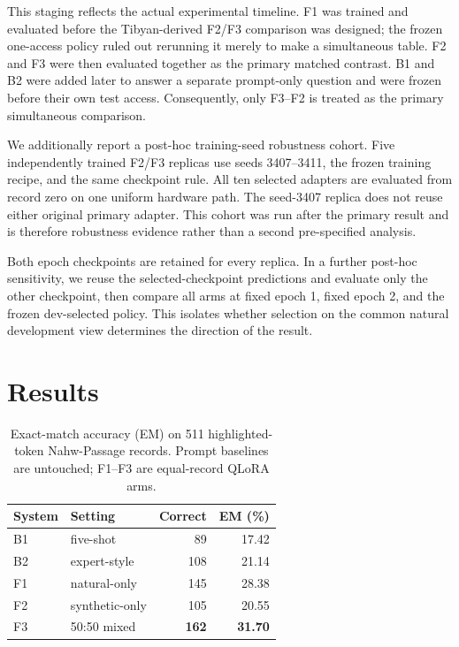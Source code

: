 \documentclass[11pt,a4paper]{article}
\begin{document}
This staging reflects the actual experimental timeline.  F1 was trained and
evaluated before the Tibyan-derived F2/F3 comparison was designed; the frozen
one-access policy ruled out rerunning it merely to make a simultaneous table.
F2 and F3 were then evaluated together as the primary matched contrast.  B1
and B2 were added later to answer a separate prompt-only question and were
frozen before their own test access.  Consequently, only F3--F2 is treated as
the primary simultaneous comparison.

We additionally report a post-hoc training-seed robustness cohort.  Five
independently trained F2/F3 replicas use seeds 3407--3411, the frozen training
recipe, and the same checkpoint rule.  All ten selected adapters are evaluated
from record zero on one uniform hardware path.  The seed-3407 replica does not
reuse either original primary adapter.  This cohort
was run after the primary result and is therefore robustness evidence rather
than a second pre-specified analysis.

Both epoch checkpoints are retained for every replica.  In a further post-hoc
sensitivity, we reuse the selected-checkpoint predictions and evaluate only
the other checkpoint, then compare all arms at fixed epoch 1, fixed epoch 2,
and the frozen dev-selected policy.  This isolates whether selection on the
common natural development view determines the direction of the result.

\section{Results}

\begin{table}[t]
\centering
\small
\begin{tabular}{llrr}
\toprule
System & Setting & Correct & EM (\%) \\
\midrule
B1 & five-shot & 89 & 17.42 \\
B2 & expert-style & 108 & 21.14 \\
\midrule
F1 & natural-only & 145 & 28.38 \\
F2 & synthetic-only & 105 & 20.55 \\
F3 & 50:50 mixed & \textbf{162} & \textbf{31.70} \\
\bottomrule
\end{tabular}
\caption{Exact-match accuracy (EM) on 511 highlighted-token Nahw-Passage
records. Prompt baselines are untouched; F1--F3 are equal-record QLoRA arms.}
\label{tab:main-results}
\end{table}
\end{document}
